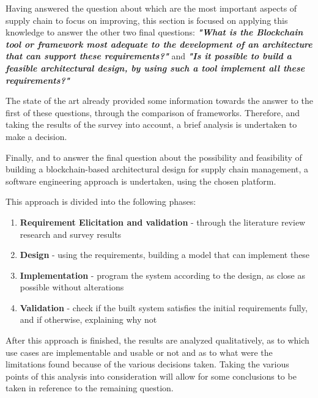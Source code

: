 Having answered the question about which are the most important aspects of supply chain to focus on improving, this section is focused on applying this knowledge to answer the other two final questions: \textbf{\textit{"What is the Blockchain tool or framework most adequate to the development of an architecture that can support these requirements?"}} and 
\textbf{\textit{"Is it possible to build a feasible architectural design, by using such a tool implement all these requirements?"}}

The state of the art already provided some information towards the answer to the first of these questions, through the comparison of frameworks. Therefore, and taking the results of the survey into account, a brief analysis is undertaken to make a decision.

Finally, and to answer the final question about the possibility and feasibility of building a blockchain-based architectural design for supply chain management, a software engineering approach is undertaken, using the chosen platform. 


This approach is divided into the following phases:
\begin{enumerate}
\item \textbf{Requirement Elicitation and validation} - through the literature review research and survey results 
\item \textbf{Design} - using the requirements, building a model that can implement these
\item \textbf{Implementation} - program the system according to the design, as close as possible without alterations
\item \textbf{Validation} - check if the built system satisfies the initial requirements fully, and if otherwise, explaining why not
\end{enumerate}

After this approach is finished, the results are analyzed qualitatively, as to which use cases are implementable and usable or not and as to what were the limitations found because of the various decisions taken. Taking the various points of this analysis into consideration will allow for some conclusions to be taken in reference to the remaining question.

